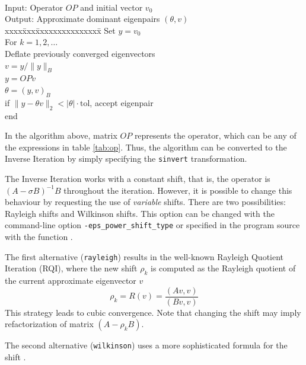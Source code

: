 \begin{algorithm}~\rm
\begin{tabbing}
Input: Operator $O\!P$ and initial vector $v_0$\\
Output: Approximate dominant eigenpairs $(\theta,v)$ \\
xxxx\=xxx\=xxxxxxxxxxxxxxx\=\kill
\> Set $y=v_0$\\
\> For $k=1,2,\ldots$\\
\> \> Deflate previously converged eigenvectors \\
\> \> $v=y/\|y\|_B$ \\
\> \> $y=O\!Pv$ \\
\> \> $\theta=(y,v)_B$ \\
\> \> if $\|y-\theta v\|_2 < |\theta| \cdot \mathrm{tol}$, accept eigenpair \\
\> end
\end{tabbing}
\end{algorithm}
In the algorithm above, matrix $O\!P$ represents the operator, which can be any of the expressions in table \ref{tab:op}. Thus, the algorithm can be converted to the Inverse Iteration by simply specifying the \texttt{sinvert} transformation.

The Inverse Iteration works with a constant shift, that is, the operator is $(A-\sigma B)^{-1}B$ throughout the iteration. However, it is possible to change this behaviour by requesting the use of \emph{variable} shifts. There are two possibilities: Rayleigh shifts and Wilkinson shifts. This option can be changed with the command-line option \Verb!-eps_power_shift_type! or specified in the program source with the function . 

The first alternative (\Verb!rayleigh!) results in the well-known Rayleigh Quotient Iteration (RQI), where the new shift $\rho_k$ is computed as the Rayleigh quotient of the current approximate eigenvector $v$
\begin{equation}
\rho_k=R(v)=\frac{(Av,v)}{(Bv,v)}
\end{equation}
This strategy leads to cubic convergence. Note that changing the shift may imply refactorization of matrix $(A-\rho_k B)$.

The second alternative (\Verb!wilkinson!) uses a more sophisticated formula for the shift \citep{Parlett:1998:SEP}.

\section{}

